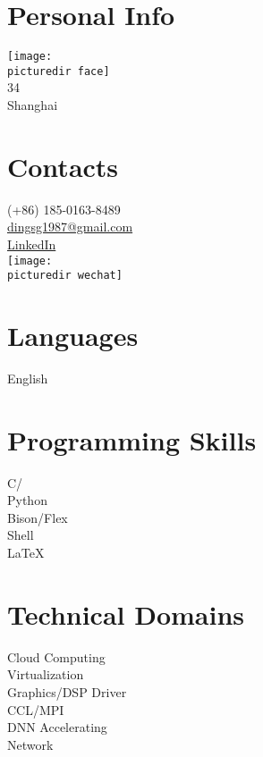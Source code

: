 \par\medskip

\section{Personal Info}
\texttt{[image: \\picturedir face]}\\
34~\faMars\\
Shanghai~\faLocationArrow\\

\section{Contacts}
(+86) 185-0163-8489~\faPhoneSquare\\
\href{mailto:dingsg1987@gmail.com}{dingsg1987@gmail.com}~\faEnvelopeSquare\\
\href{https://cn.linkedin.com/in/shengge-ding-9a844b36}{LinkedIn}~\faLinkedinSquare\\
\texttt{[image: \\picturedir wechat]}\\

\section{Languages}
English~\faStarHalfO\\

\section{Programming Skills}
C/\CPP~\faStar\faStar\faStar\\
Python~\faStar\faStar\faStarHalfO\\
Bison/Flex~\faStarHalfO\\
Shell~\faStar\faStarHalfO\\
\LaTeX{}~\faStarHalfO\\

\section{Technical Domains}
Cloud Computing~\faStar\faStarHalfO\\
Virtualization~\faStar\faStar\faStarHalfO\\
Graphics/DSP Driver~\faStar\faStar\faStar\\
CCL/MPI~\faStar\faStarHalfO\\
DNN Accelerating~\faStar\\
Network~\faStarHalfO\\
